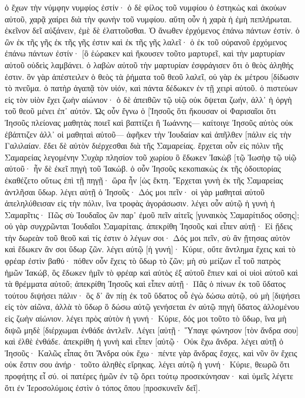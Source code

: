 ὁ ἔχων τὴν νύμφην νυμφίος ἐστίν· ὁ δὲ φίλος τοῦ νυμφίου ὁ ἑστηκὼς καὶ ἀκούων αὐτοῦ, χαρᾷ χαίρει διὰ τὴν φωνὴν τοῦ νυμφίου. αὕτη οὖν ἡ χαρὰ ἡ ἐμὴ πεπλήρωται. 
ἐκεῖνον δεῖ αὐξάνειν, ἐμὲ δὲ ἐλαττοῦσθαι. 
Ὁ ἄνωθεν ἐρχόμενος ἐπάνω πάντων ἐστίν. ὁ ὢν ἐκ τῆς γῆς ἐκ τῆς γῆς ἐστιν καὶ ἐκ τῆς γῆς λαλεῖ· ὁ ἐκ τοῦ οὐρανοῦ ἐρχόμενος ἐπάνω πάντων ἐστίν· 
[ὃ ἑώρακεν καὶ ἤκουσεν τοῦτο μαρτυρεῖ, καὶ τὴν μαρτυρίαν αὐτοῦ οὐδεὶς λαμβάνει. 
ὁ λαβὼν αὐτοῦ τὴν μαρτυρίαν ἐσφράγισεν ὅτι ὁ θεὸς ἀληθής ἐστιν. 
ὃν γὰρ ἀπέστειλεν ὁ θεὸς τὰ ῥήματα τοῦ θεοῦ λαλεῖ, οὐ γὰρ ἐκ μέτρου [δίδωσιν τὸ πνεῦμα. 
ὁ πατὴρ ἀγαπᾷ τὸν υἱόν, καὶ πάντα δέδωκεν ἐν τῇ χειρὶ αὐτοῦ. 
ὁ πιστεύων εἰς τὸν υἱὸν ἔχει ζωὴν αἰώνιον· ὁ δὲ ἀπειθῶν τῷ υἱῷ οὐκ ὄψεται ζωήν, ἀλλ᾽ ἡ ὀργὴ τοῦ θεοῦ μένει ἐπ᾽ αὐτόν. 
Ὡς οὖν ἔγνω ὁ [Ἰησοῦς ὅτι ἤκουσαν οἱ Φαρισαῖοι ὅτι Ἰησοῦς πλείονας μαθητὰς ποιεῖ καὶ βαπτίζει ἢ Ἰωάννης— 
καίτοιγε Ἰησοῦς αὐτὸς οὐκ ἐβάπτιζεν ἀλλ᾽ οἱ μαθηταὶ αὐτοῦ— 
ἀφῆκεν τὴν Ἰουδαίαν καὶ ἀπῆλθεν [πάλιν εἰς τὴν Γαλιλαίαν. 
ἔδει δὲ αὐτὸν διέρχεσθαι διὰ τῆς Σαμαρείας. 
ἔρχεται οὖν εἰς πόλιν τῆς Σαμαρείας λεγομένην Συχὰρ πλησίον τοῦ χωρίου ὃ ἔδωκεν Ἰακὼβ [τῷ Ἰωσὴφ τῷ υἱῷ αὐτοῦ· 
ἦν δὲ ἐκεῖ πηγὴ τοῦ Ἰακώβ. ὁ οὖν Ἰησοῦς κεκοπιακὼς ἐκ τῆς ὁδοιπορίας ἐκαθέζετο οὕτως ἐπὶ τῇ πηγῇ· ὥρα ἦν [ὡς ἕκτη. 
Ἔρχεται γυνὴ ἐκ τῆς Σαμαρείας ἀντλῆσαι ὕδωρ. λέγει αὐτῇ ὁ Ἰησοῦς· Δός μοι πεῖν· 
οἱ γὰρ μαθηταὶ αὐτοῦ ἀπεληλύθεισαν εἰς τὴν πόλιν, ἵνα τροφὰς ἀγοράσωσιν. 
λέγει οὖν αὐτῷ ἡ γυνὴ ἡ Σαμαρῖτις· Πῶς σὺ Ἰουδαῖος ὢν παρ᾽ ἐμοῦ πεῖν αἰτεῖς [γυναικὸς Σαμαρίτιδος οὔσης]; οὐ γὰρ συγχρῶνται Ἰουδαῖοι Σαμαρίταις. 
ἀπεκρίθη Ἰησοῦς καὶ εἶπεν αὐτῇ· Εἰ ᾔδεις τὴν δωρεὰν τοῦ θεοῦ καὶ τίς ἐστιν ὁ λέγων σοι· Δός μοι πεῖν, σὺ ἂν ᾔτησας αὐτὸν καὶ ἔδωκεν ἄν σοι ὕδωρ ζῶν. 
λέγει αὐτῷ [ἡ γυνή]· Κύριε, οὔτε ἄντλημα ἔχεις καὶ τὸ φρέαρ ἐστὶν βαθύ· πόθεν οὖν ἔχεις τὸ ὕδωρ τὸ ζῶν; 
μὴ σὺ μείζων εἶ τοῦ πατρὸς ἡμῶν Ἰακώβ, ὃς ἔδωκεν ἡμῖν τὸ φρέαρ καὶ αὐτὸς ἐξ αὐτοῦ ἔπιεν καὶ οἱ υἱοὶ αὐτοῦ καὶ τὰ θρέμματα αὐτοῦ; 
ἀπεκρίθη Ἰησοῦς καὶ εἶπεν αὐτῇ· Πᾶς ὁ πίνων ἐκ τοῦ ὕδατος τούτου διψήσει πάλιν· 
ὃς δ᾽ ἂν πίῃ ἐκ τοῦ ὕδατος οὗ ἐγὼ δώσω αὐτῷ, οὐ μὴ [διψήσει εἰς τὸν αἰῶνα, ἀλλὰ τὸ ὕδωρ ὃ δώσω αὐτῷ γενήσεται ἐν αὐτῷ πηγὴ ὕδατος ἁλλομένου εἰς ζωὴν αἰώνιον. 
λέγει πρὸς αὐτὸν ἡ γυνή· Κύριε, δός μοι τοῦτο τὸ ὕδωρ, ἵνα μὴ διψῶ μηδὲ [διέρχωμαι ἐνθάδε ἀντλεῖν. 
Λέγει [αὐτῇ· Ὕπαγε φώνησον [τὸν ἄνδρα σου] καὶ ἐλθὲ ἐνθάδε. 
ἀπεκρίθη ἡ γυνὴ καὶ εἶπεν [αὐτῷ· Οὐκ ἔχω ἄνδρα. λέγει αὐτῇ ὁ Ἰησοῦς· Καλῶς εἶπας ὅτι Ἄνδρα οὐκ ἔχω· 
πέντε γὰρ ἄνδρας ἔσχες, καὶ νῦν ὃν ἔχεις οὐκ ἔστιν σου ἀνήρ· τοῦτο ἀληθὲς εἴρηκας. 
λέγει αὐτῷ ἡ γυνή· Κύριε, θεωρῶ ὅτι προφήτης εἶ σύ. 
οἱ πατέρες ἡμῶν ἐν τῷ ὄρει τούτῳ προσεκύνησαν· καὶ ὑμεῖς λέγετε ὅτι ἐν Ἱεροσολύμοις ἐστὶν ὁ τόπος ὅπου [προσκυνεῖν δεῖ]. 
